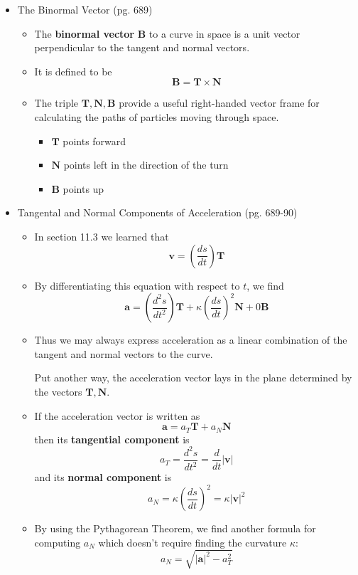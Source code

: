 \documentclass[12pt]{article}
\theoremstyle{plain}
\theoremstyle{definition}
\theoremstyle{remark}
\newcommand{\vect}[1]{\mathbf{#1}}
\begin{document}
	\begin{itemize}
	
	\item The Binormal Vector (pg. 689)
	
		\begin{itemize}
		\item The \textbf{binormal vector} $\vect{B}$ to a curve in space is a unit vector perpendicular to the tangent and normal vectors.
		\item It is defined to be \[\vect{B} = \vect{T} \times \vect{N}\]
		\item The triple $\vect{T},\vect{N},\vect{B}$ provide a useful right-handed vector frame for calculating the paths of particles moving through space.
			\begin{itemize}
			\item $\vect{T}$ points forward
			\item $\vect{N}$ points left in the direction of the turn
			\item $\vect{B}$ points up
			\end{itemize}
		\end{itemize}
		
	\item Tangental and Normal Components of Acceleration (pg. 689-90)
	
		\begin{itemize}
		\item In section 11.3 we learned that \[\vect{v} = \left(\frac{ds}{dt}\right)\vect{T}\]
		\item By differentiating this equation with respect to $t$, we find \[\vect{a} = \left(\frac{d^2s}{dt^2}\right)\vect{T} + \kappa\left(\frac{ds}{dt}\right)^2\vect{N}+0\vect{B}\]
		\item Thus we may always express acceleration as a linear combination of the tangent and normal vectors to the curve. 
		
		Put another way, the acceleration vector lays in the plane determined by the vectors $\vect{T},\vect{N}$.
		\item If the acceleration vector is written as
		\[\vect{a} = a_T\vect{T}+a_N\vect{N}\]
		then its \textbf{tangential component} is
		\[a_T = \frac{d^2s}{dt^2} = \frac{d}{dt}|\vect{v}| \]
		and its \textbf{normal component} is
		\[a_N = \kappa\left(\frac{ds}{dt}\right)^2 = \kappa|\vect{v}|^2\]
		\item By using the Pythagorean Theorem, we find another formula for computing $a_N$ which doesn't require finding the curvature $\kappa$:
		\[a_N = \sqrt{|\vect{a}|^2 - a_T^2}\]
		\end{itemize}
	

\end{itemize}
\end{document}
